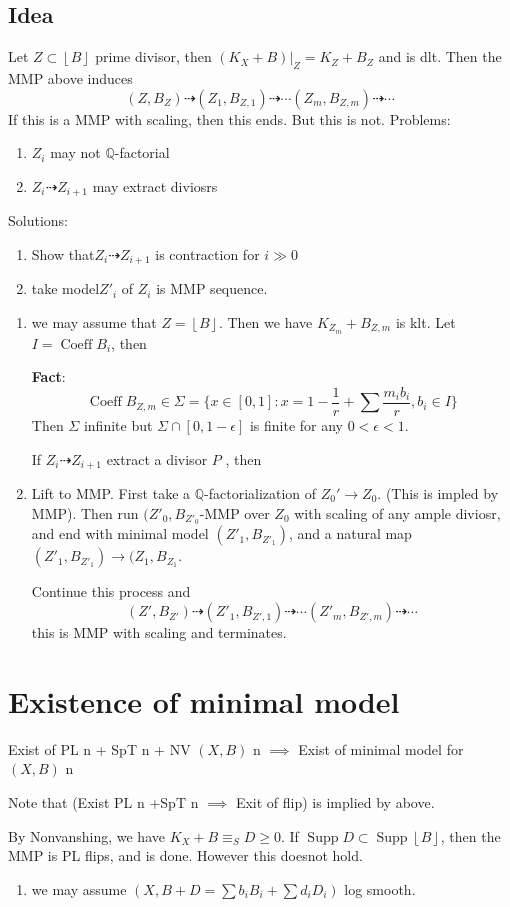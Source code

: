 \documentclass{article}
\begin{document}
\subsection{Idea}
Let $Z \subset \left\lfloor B \right\rfloor$ prime divisor, then $(K_{X}+B)|_{Z}=K_{Z}+B_{Z}$ and is dlt. Then the MMP above induces 
\[
  (Z,B_{Z})\dashrightarrow (Z_{1},B_{Z,1}) \dashrightarrow \cdots (Z_{m},B_{Z,m}) \dashrightarrow \cdots
\]
If this is a MMP with scaling, then this ends. But this is not. Problems:
\begin{enumerate}
  \item $Z_{i}$ may not $\mathbb{Q}$-factorial
    \item  $Z_{i}\dashrightarrow Z_{i+1}$ may extract diviosrs
\end{enumerate}
Solutions:
\begin{enumerate}
  \item Show that$Z_{i}\dashrightarrow Z_{i+1}$ is contraction for $i\gg 0$
\item  take model$Z'_{i}$ of  $Z_{i}$ is MMP sequence.
\end{enumerate}
\begin{enumerate}[Step1]
  \item we may assume that $Z=\left\lfloor B \right\rfloor$. Then we have $K_{Z_{m}}+B_{Z,m}$ is klt. Let $I =\operatorname{Coeff} B_{i}$, then 

\textbf{Fact}: 
\[
  \operatorname{Coeff}B_{Z,m} \in \Sigma= \{ x \in [0,1]: x=1 - \frac{1}{r}+\sum \frac{m_{i}b_{i}}{r} , b_{i} \in I\} 
\]
Then $\Sigma$ infinite but $\Sigma \cap [0,1-\epsilon]$ is finite for any $0<\epsilon<1$.

If $Z_{i}\dashrightarrow Z_{i+1}$ extract a divisor $P$ , then 

\item  Lift to MMP. First take a $\mathbb{Q}$-factorialization of  $Z_{0}'\to Z_{0}$. (This is impled by MMP). Then run $(Z'_{0},B_{Z'_{0}}$-MMP over $Z_{0}$ with scaling of any ample diviosr, and end with minimal model $(Z'_{1},B_{Z'_1})$, and a natural map $(Z'_{1},B_{Z'_1})\to(Z_{1},B_{Z_{1}}$.

  Continue this process and  
  \[
    (Z',B_{Z'})\dashrightarrow (Z'_{1},B_{Z',1}) \dashrightarrow \cdots (Z'_{m},B_{Z',m}) \dashrightarrow \cdots
  \]
 this is MMP with scaling and terminates. 
\end{enumerate}
\section{Existence of minimal model}
   Exist of PL n + SpT n + NV $(X,B)$ n  $\implies$ Exist of minimal model for $(X,B)$ n

   Note that (Exist PL n +SpT n $\implies$ Exit of flip) is implied by above.

By Nonvanshing, we have $K_{X}+B \equiv_{S} D\geqslant 0$. If $\operatorname{Supp}D \subset \operatorname{Supp}\left\lfloor B \right\rfloor$, then the MMP is PL flips, and is done. However this doesnot hold.

\begin{enumerate}[Step0]
  \item we may assume $(X,B+D=\sum b_{i}B_{i}+\sum d_{i}D_{i})$ log smooth. 
\end{enumerate}
\end{document}
